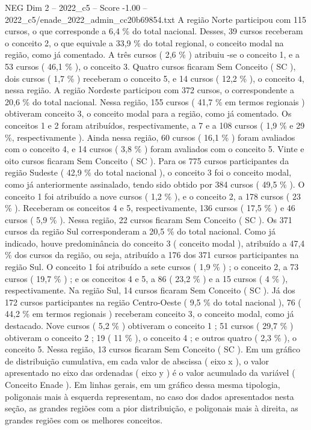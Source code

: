 \begin{textsample}{NEG Dim 2 – 2022\_c5 – Score -1.00 – 2022\_c5/enade\_2022\_admin\_cc20b69854.txt}
A região Norte participou com 115 cursos, o que corresponde a 6,4 \% do total nacional.
Desses, 39 cursos receberam o conceito 2, o que equivale a 33,9 \% do total regional, o conceito modal na região, como já comentado.
A três cursos ( 2,6 \% ) atribuiu -se o conceito 1, e a 53 cursos ( 46,1 \% ), o conceito 3.
Quatro cursos ficaram Sem Conceito ( SC ), dois cursos ( 1,7 \% ) receberam o conceito 5, e 14 cursos ( 12,2 \% ), o conceito 4, nessa região.
A região Nordeste participou com 372 cursos, o correspondente a 20,6 \% do total nacional.
Nessa região, 155 cursos ( 41,7 \% em termos regionais ) obtiveram conceito 3, o conceito modal para a região, como já comentado.
Os conceitos 1 e 2 foram atribuídos, respectivamente, a 7 e a 108 cursos ( 1,9 \% e 29 \%, respectivamente ).
Ainda nessa região, 60 cursos ( 16,1 \% ) foram avaliados com o conceito 4, e 14 cursos ( 3,8 \% ) foram avaliados com o conceito 5.
Vinte e oito cursos ficaram Sem Conceito ( SC ).
Para os 775 cursos participantes da região Sudeste ( 42,9 \% do total nacional ), o conceito 3 foi o conceito modal, como já anteriormente assinalado, tendo sido obtido por 384 cursos ( 49,5 \% ).
O conceito 1 foi atribuído a nove cursos ( 1,2 \% ), e o conceito 2, a 178 cursos ( 23 \% ).
Receberam os conceitos 4 e 5, respectivamente, 136 cursos ( 17,5 \% ) e 46 cursos ( 5,9 \% ).
Nessa região, 22 cursos ficaram Sem Conceito ( SC ).
Os 371 cursos da região Sul corresponderam a 20,5 \% do total nacional.
Como já indicado, houve predominância do conceito 3 ( conceito modal ), atribuído a 47,4 \% dos cursos da região, ou seja, atribuído a 176 dos 371 cursos participantes na região Sul.
O conceito 1 foi atribuído a sete cursos ( 1,9 \% ) ; o conceito 2, a 73 cursos ( 19,7 \% ) ; e os conceitos 4 e 5, a 86 ( 23,2 \% ) e a 15 cursos ( 4 \% ), respectivamente.
Na região Sul, 14 cursos ficaram Sem Conceito ( SC ).
Já dos 172 cursos participantes na região Centro-Oeste ( 9,5 \% do total nacional ), 76 ( 44,2 \% em termos regionais ) receberam conceito 3, o conceito modal, como já destacado.
Nove cursos ( 5,2 \% ) obtiveram o conceito 1 ; 51 cursos ( 29,7 \% ) obtiveram o conceito 2 ; 19 ( 11 \% ), o conceito 4 ; e outros quatro ( 2,3 \% ), o conceito 5.
Nessa região, 13 cursos ficaram Sem Conceito ( SC ).
Em um gráfico de distribuição cumulativa, em cada valor de abscissa ( eixo x ), o valor apresentado no eixo das ordenadas ( eixo y ) é o valor acumulado da variável ( Conceito Enade ).
Em linhas gerais, em um gráfico dessa mesma tipologia, poligonais mais à esquerda representam, no caso dos dados apresentados nesta seção, as grandes regiões com a pior distribuição, e poligonais mais à direita, as grandes regiões com os melhores conceitos.

\end{textsample}
